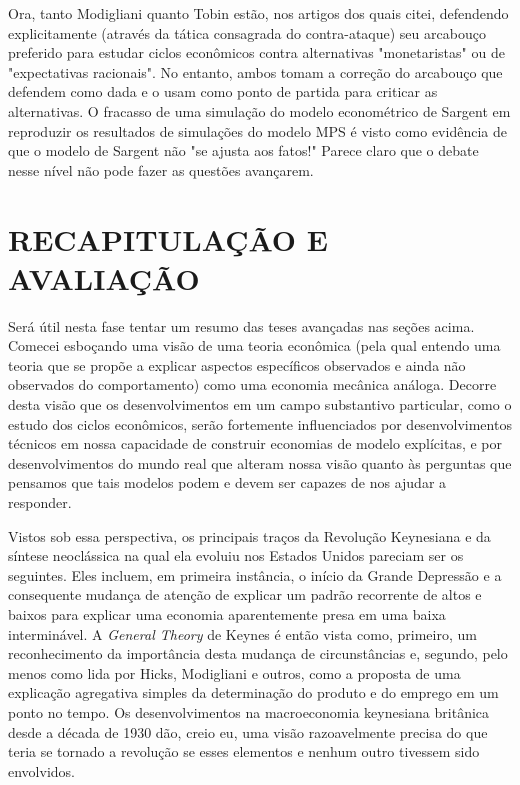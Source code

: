 \documentclass[12pt]{article}
\begin{document}
Ora, tanto Modigliani quanto Tobin estão, nos artigos dos quais citei, defendendo explicitamente (através da tática consagrada do contra-ataque) seu arcabouço preferido para estudar ciclos econômicos contra alternativas "monetaristas" ou de "expectativas racionais". No entanto, ambos tomam a correção do arcabouço que defendem como dada e o usam como ponto de partida para criticar as alternativas. O fracasso de uma simulação do modelo econométrico de Sargent em reproduzir os resultados de simulações do modelo MPS é visto como evidência de que o modelo de Sargent não "se ajusta aos fatos!" Parece claro que o debate nesse nível não pode fazer as questões avançarem.

\section{RECAPITULAÇÃO E AVALIAÇÃO}

Será útil nesta fase tentar um resumo das teses avançadas nas seções acima. Comecei esboçando uma visão de uma teoria econômica (pela qual entendo uma teoria que se propõe a explicar aspectos específicos observados e ainda não observados do comportamento) como uma economia mecânica análoga. Decorre desta visão que os desenvolvimentos em um campo substantivo particular, como o estudo dos ciclos econômicos, serão fortemente influenciados por desenvolvimentos técnicos em nossa capacidade de construir economias de modelo explícitas, e por desenvolvimentos do mundo real que alteram nossa visão quanto às perguntas que pensamos que tais modelos podem e devem ser capazes de nos ajudar a responder.

Vistos sob essa perspectiva, os principais traços da Revolução Keynesiana e da síntese neoclássica na qual ela evoluiu nos Estados Unidos pareciam ser os seguintes. Eles incluem, em primeira instância, o início da Grande Depressão e a consequente mudança de atenção de explicar um padrão recorrente de altos e baixos para explicar uma economia aparentemente presa em uma baixa interminável. A \textit{General Theory} de Keynes é então vista como, primeiro, um reconhecimento da importância desta mudança de circunstâncias e, segundo, pelo menos como lida por Hicks, Modigliani e outros, como a proposta de uma explicação agregativa simples da determinação do produto e do emprego em um ponto no tempo. Os desenvolvimentos na macroeconomia keynesiana britânica desde a década de 1930 dão, creio eu, uma visão razoavelmente precisa do que teria se tornado a revolução se esses elementos e nenhum outro tivessem sido envolvidos.
\end{document}
